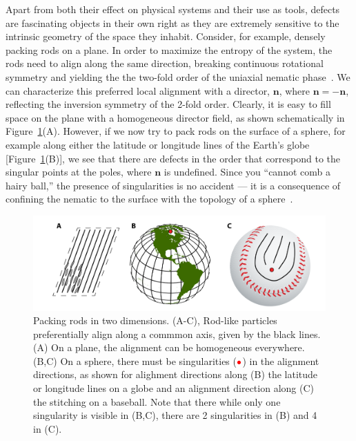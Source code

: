 Apart from both their effect on physical systems and their use as tools, defects are fascinating objects in their own right as they are extremely sensitive to the intrinsic geometry of the space they inhabit.
Consider, for example, densely packing rods on a plane.
In order to maximize the entropy of the system, the rods need to align along the same direction, breaking continuous rotational symmetry and yielding the the two-fold order of the uniaxial nematic phase~\cite{RN204}.
We can characterize this preferred local alignment with a director, $\mathbf{n}$, where $\mathbf{n} = \mathbf{-n}$, reflecting the inversion symmetry of the 2-fold order.
Clearly, it is easy to fill space on the plane with a homogeneous director field, as shown schematically in Figure~\ref{f:1-RodsPlane}(A).
However, if we now try to pack rods on the surface of a sphere, for example along either the latitude or longitude lines of the Earth's globe [Figure~\ref{f:1-RodsPlane}(B)], we see that there are defects in the order that correspond to the singular points at the poles, where $\mathbf{n}$ is undefined.
Since you ``cannot comb a hairy ball,'' the presence of singularities is no accident --- it is a consequence of confining the nematic to the surface with the topology of a sphere~\cite{RN209,RN169}.
\begin{figure}
  \centering
  \includegraphics{figures/C1/Ch1-Figs_RodsPlane.png}
  \caption{Packing rods in two dimensions.
  (A-C), Rod-like particles preferentially align along a commmon axis, given by the black lines.
  (A) On a plane, the alignment can be homogeneous everywhere.
  (B,C) On a sphere, there must be singularities (${\color{red} \bullet}$) in the alignment directions, as shown for alighment directions along (B) the latitude or longitude lines on a globe and an alignment direction along (C) the stitching on a baseball.
  Note that there while only one singularity is visible in (B,C), there are 2 singularities in (B) and 4 in (C).}\label{f:1-RodsPlane}
\end{figure}

